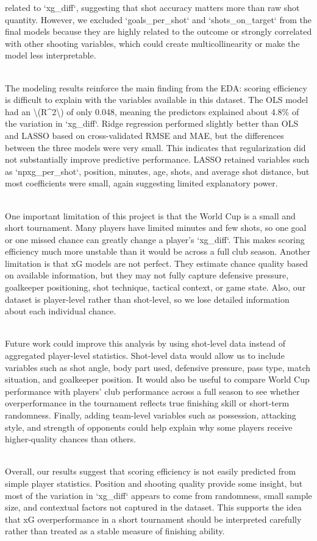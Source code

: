 \documentclass[
  letterpaper,
  DIV=11,
  numbers=noendperiod]{scrartcl}
\begin{document}
related to `xg\_diff`, suggesting that shot accuracy matters more than
raw shot quantity. However, we excluded `goals\_per\_shot` and
`shots\_on\_target` from the final models because they are highly
related to the outcome or strongly correlated with other shooting
variables, which could create multicollinearity or make the model less
interpretable.\\
\strut \\
The modeling results reinforce the main finding from the EDA: scoring
efficiency is difficult to explain with the variables available in this
dataset. The OLS model had an \textbackslash(R\^{}2\textbackslash) of
only 0.048, meaning the predictors explained about 4.8\% of the
variation in `xg\_diff`. Ridge regression performed slightly better than
OLS and LASSO based on cross-validated RMSE and MAE, but the differences
between the three models were very small. This indicates that
regularization did not substantially improve predictive performance.
LASSO retained variables such as `npxg\_per\_shot`, position, minutes,
age, shots, and average shot distance, but most coefficients were small,
again suggesting limited explanatory power.\\
\strut \\
One important limitation of this project is that the World Cup is a
small and short tournament. Many players have limited minutes and few
shots, so one goal or one missed chance can greatly change a player's
`xg\_diff`. This makes scoring efficiency much more unstable than it
would be across a full club season. Another limitation is that xG models
are not perfect. They estimate chance quality based on available
information, but they may not fully capture defensive pressure,
goalkeeper positioning, shot technique, tactical context, or game state.
Also, our dataset is player-level rather than shot-level, so we lose
detailed information about each individual chance.\\
\strut \\
Future work could improve this analysis by using shot-level data instead
of aggregated player-level statistics. Shot-level data would allow us to
include variables such as shot angle, body part used, defensive
pressure, pass type, match situation, and goalkeeper position. It would
also be useful to compare World Cup performance with players' club
performance across a full season to see whether overperformance in the
tournament reflects true finishing skill or short-term randomness.
Finally, adding team-level variables such as possession, attacking
style, and strength of opponents could help explain why some players
receive higher-quality chances than others.\\
\strut \\
Overall, our results suggest that scoring efficiency is not easily
predicted from simple player statistics. Position and shooting quality
provide some insight, but most of the variation in `xg\_diff` appears to
come from randomness, small sample size, and contextual factors not
captured in the dataset. This supports the idea that xG overperformance
in a short tournament should be interpreted carefully rather than
treated as a stable measure of finishing ability.
\end{document}
